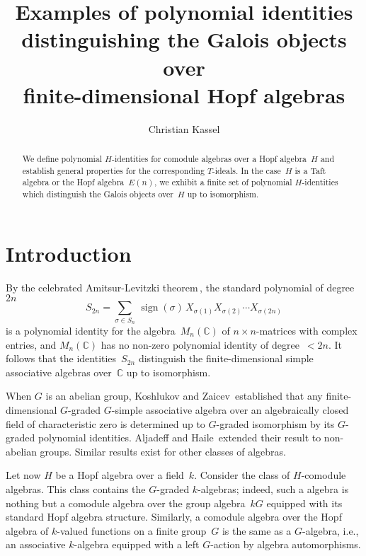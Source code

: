 \documentclass[11pt, a4paper]{amsart}
\title[Polynomial identities distinguishing Galois objects]
{Examples of polynomial identities\\ 
distinguishing the Galois objects over\\ 
finite-dimensional Hopf algebras}
\author[Christian Kassel]
{Christian Kassel}
\theoremstyle{definition}
\numberwithin{equation}{section}
\begin{document}
\begin{abstract}
We define polynomial $H$-identities for comodule algebras over a Hopf algebra~$H$
and establish general properties for the corresponding $T$-ideals.
In the case~$H$ is a Taft algebra or the Hopf algebra~$E(n)$,
we exhibit a finite set of polynomial $H$-identities which distinguish the Galois objects over~$H$
up to isomorphism.
\end{abstract}

\maketitle

\section{Introduction}

By the celebrated Amitsur-Levitzki theorem\,\cite{AL}, the standard polynomial of degree~$2n$ 
\begin{equation*}
S_{2n} = \sum_{\sigma \in S_n} \, \operatorname{sign}(\sigma) \, X_{\sigma(1)} X_{\sigma(2)} \cdots X_{\sigma(2n)}
\end{equation*}
is a polynomial identity for the algebra~$M_n({\mathbb{C}})$ of $n\times n$-matrices
with complex entries,
and $M_n({\mathbb{C}})$ has no non-zero polynomial identity of degree~$< 2n$.
It follows that the identities~$S_{2n}$ distinguish the
finite-dimensional simple associative algebras over~${\mathbb{C}}$ up to isomorphism. 

When $G$ is an abelian group, Koshlukov and Zaicev\,\cite{KZ} established that 
any finite-dimensional $G$-graded $G$-simple associative algebra 
over an algebraically closed field of characteristic zero
is determined up to $G$-graded isomorphism by its $G$-graded polynomial identities.
Aljadeff and Haile\,\cite{AH} extended their result to non-abelian groups.
Similar results exist for other classes of algebras.

Let now $H$ be a Hopf algebra over a field~$k$. Consider the class of $H$-comodule algebras.
This class contains the $G$-graded $k$-algebras; indeed, such a algebra is nothing but
a comodule algebra over the group algebra~$kG$ equipped with its standard Hopf algebra structure. 
Similarly, a comodule algebra over the Hopf algebra
of $k$-valued functions on a finite group~$G$ is the same as a $G$-algebra, i.e., an associative $k$-algebra
equipped with a left $G$-action by algebra automorphisms.
\end{document}
